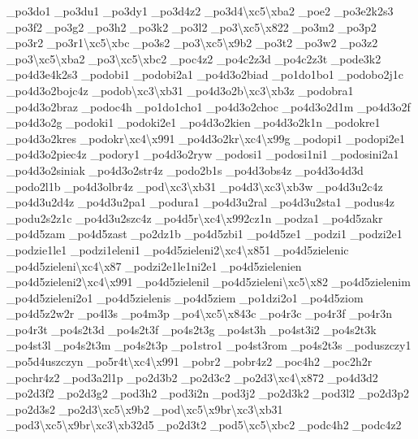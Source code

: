 {\-\_\-po3do1 \-\_\-po3du1 \-\_\-po3dy1 \-\_\-po3d4z2 \-\_\-po3d4\textbackslash{}xc5\textbackslash{}xba2 \-\_\-poe2 \-\_\-po3e2k2s3 \-\_\-po3f2 \-\_\-po3g2 \-\_\-po3h2 \-\_\-po3k2 \-\_\-po3l2 \-\_\-po3\textbackslash{}xc5\textbackslash{}x822 \-\_\-po3m2 \-\_\-po3p2 \-\_\-po3r2 \-\_\-po3r1\textbackslash{}xc5\textbackslash{}xbc \-\_\-po3s2 \-\_\-po3\textbackslash{}xc5\textbackslash{}x9b2 \-\_\-po3t2 \-\_\-po3w2 \-\_\-po3z2 \-\_\-po3\textbackslash{}xc5\textbackslash{}xba2 \-\_\-po3\textbackslash{}xc5\textbackslash{}xbc2 \-\_\-poc4z2 \-\_\-po4c2z3d \-\_\-po4c2z3t \-\_\-pode3k2 \-\_\-po4d3e4k2s3 \-\_\-podobi1 \-\_\-podobi2a1 \-\_\-po4d3o2biad \-\_\-po1do1bo1 \-\_\-podobo2j1c \-\_\-po4d3o2bojc4z \-\_\-podob\textbackslash{}xc3\textbackslash{}xb31 \-\_\-po4d3o2b\textbackslash{}xc3\textbackslash{}xb3z \-\_\-podobra1 \-\_\-po4d3o2braz \-\_\-podoc4h \-\_\-po1do1cho1 \-\_\-po4d3o2choc \-\_\-po4d3o2d1m \-\_\-po4d3o2f \-\_\-po4d3o2g \-\_\-podoki1 \-\_\-podoki2e1 \-\_\-po4d3o2kien \-\_\-po4d3o2k1n \-\_\-podokre1 \-\_\-po4d3o2kres \-\_\-podokr\textbackslash{}xc4\textbackslash{}x991 \-\_\-po4d3o2kr\textbackslash{}xc4\textbackslash{}x99g \-\_\-podopi1 \-\_\-podopi2e1 \-\_\-po4d3o2piec4z \-\_\-podory1 \-\_\-po4d3o2ryw \-\_\-podosi1 \-\_\-podosi1ni1 \-\_\-podosini2a1 \-\_\-po4d3o2siniak \-\_\-po4d3o2str4z \-\_\-podo2b1s \-\_\-po4d3obs4z \-\_\-po4d3o4d3d \-\_\-podo2l1b \-\_\-po4d3olbr4z \-\_\-pod\textbackslash{}xc3\textbackslash{}xb31 \-\_\-po4d3\textbackslash{}xc3\textbackslash{}xb3w \-\_\-po4d3u2c4z \-\_\-po4d3u2d4z \-\_\-po4d3u2pa1 \-\_\-podura1 \-\_\-po4d3u2ral \-\_\-po4d3u2sta1 \-\_\-podus4z \-\_\-podu2s2z1c \-\_\-po4d3u2szc4z \-\_\-po4d5r\textbackslash{}xc4\textbackslash{}x992cz1n \-\_\-podza1 \-\_\-po4d5zakr \-\_\-po4d5zam \-\_\-po4d5zast \-\_\-po2dz1b \-\_\-po4d5zbi1 \-\_\-po4d5ze1 \-\_\-podzi1 \-\_\-podzi2e1 \-\_\-podzie1le1 \-\_\-podzi1eleni1 \-\_\-po4d5zieleni2\textbackslash{}xc4\textbackslash{}x851 \-\_\-po4d5zielenic \-\_\-po4d5zieleni\textbackslash{}xc4\textbackslash{}x87 \-\_\-podzi2e1le1ni2e1 \-\_\-po4d5zielenien \-\_\-po4d5zieleni2\textbackslash{}xc4\textbackslash{}x991 \-\_\-po4d5zielenil \-\_\-po4d5zieleni\textbackslash{}xc5\textbackslash{}x82 \-\_\-po4d5zielenim \-\_\-po4d5zieleni2o1 \-\_\-po4d5zielenis \-\_\-po4d5ziem \-\_\-po1dzi2o1 \-\_\-po4d5ziom \-\_\-po4d5z2w2r \-\_\-po4l3s \-\_\-po4m3p \-\_\-po4\textbackslash{}xc5\textbackslash{}x843c \-\_\-po4r3c \-\_\-po4r3f \-\_\-po4r3n \-\_\-po4r3t \-\_\-po4s2t3d \-\_\-po4s2t3f \-\_\-po4s2t3g \-\_\-po4st3h \-\_\-po4st3i2 \-\_\-po4s2t3k \-\_\-po4st3l \-\_\-po4s2t3m \-\_\-po4s2t3p \-\_\-po1stro1 \-\_\-po4st3rom \-\_\-po4s2t3s \-\_\-poduszczy1 \-\_\-po5d4uszczyn \-\_\-po5r4t\textbackslash{}xc4\textbackslash{}x991 \-\_\-pobr2 \-\_\-pobr4z2 \-\_\-poc4h2 \-\_\-poc2h2r \-\_\-pochr4z2 \-\_\-pod3a2l1p \-\_\-po2d3b2 \-\_\-po2d3c2 \-\_\-po2d3\textbackslash{}xc4\textbackslash{}x872 \-\_\-po4d3d2 \-\_\-po2d3f2 \-\_\-po2d3g2 \-\_\-pod3h2 \-\_\-pod3i2n \-\_\-pod3j2 \-\_\-po2d3k2 \-\_\-pod3l2 \-\_\-po2d3p2 \-\_\-po2d3s2 \-\_\-po2d3\textbackslash{}xc5\textbackslash{}x9b2 \-\_\-pod\textbackslash{}xc5\textbackslash{}x9br\textbackslash{}xc3\textbackslash{}xb31 \-\_\-pod3\textbackslash{}xc5\textbackslash{}x9br\textbackslash{}xc3\textbackslash{}xb32d5 \-\_\-po2d3t2 \-\_\-pod5\textbackslash{}xc5\textbackslash{}xbc2 \-\_\-podc4h2 \-\_\-podc4z2 }
